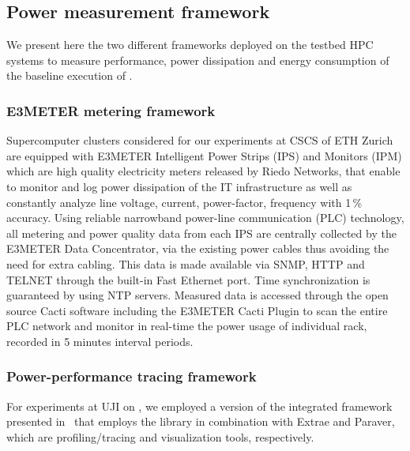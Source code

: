 \subsection{Power measurement framework}
\label{subsec:3.3}

We present here the two different  frameworks deployed on the testbed HPC systems to
measure  performance, power  dissipation and energy consumption of the baseline execution of \cosmoart.

\subsubsection{E3METER metering framework}

Supercomputer  clusters considered  for our  experiments at CSCS of ETH Zurich are equipped with
E3METER Intelligent  Power Strips (IPS)  and Monitors (IPM)  which are
high   quality   electricity  meters   released   by  Riedo   Networks, 
  that  enable   to  monitor   and   log  power
dissipation  of the IT  infrastructure as  well as  constantly analyze
line  voltage,  current, power-factor,  frequency  with 1\,\%  accuracy.
Using  reliable narrowband  power-line communication  (PLC) technology,
all  metering and  power  quality  data from  each  IPS are  centrally
collected  by the E3METER  Data Concentrator,  via the  existing power
cables thus  avoiding the need for  extra cabling.  This  data is made
available via  SNMP, HTTP and TELNET  through the built-in  Fast Ethernet
port.   Time  synchronization  is  guaranteed by  using  NTP  servers.
Measured  data is  accessed  through the  open  source Cacti  software
including the E3METER Cacti Plugin  to scan the entire PLC network and
monitor in real-time the power usage of individual rack, recorded in 5
minutes interval periods.

\subsubsection{Power-performance tracing framework}

For experiments at UJI on \tinto, we employed a version
of the integrated framework presented in~\cite{energy13} that employs the \pmlib library in
combination with Extrae and Paraver, which  are profiling/tracing and
visualization tools, respectively. 

